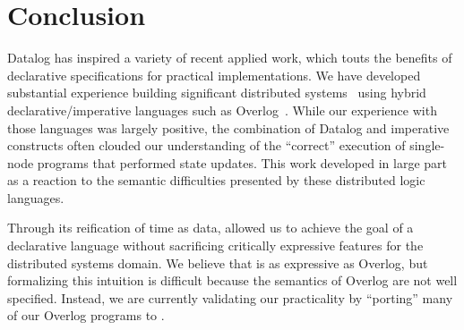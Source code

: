 \section{Conclusion}



Datalog has inspired a variety of recent applied work, which touts the benefits of declarative specifications for practical implementations.  
% 
% 
We have developed substantial experience building significant
distributed systems~\cite{boom-eurosys,Alvaro2009I-Do-Declare:-C,Chu:2007,Loo2009-CACM} using hybrid
declarative/imperative languages such as Overlog~\cite{Loo2009-CACM}.
While our experience with those languages was largely positive, the 
combination of Datalog and imperative constructs 
often clouded  our understanding of the
``correct'' execution of single-node programs that performed state
updates.  
This work developed in large part as a reaction to the semantic difficulties
presented by these distributed logic languages.  

Through its reification of time as data, \lang allowed us to 
achieve the goal of a declarative language without sacrificing critically expressive features for the distributed systems domain.
We believe that \lang is as expressive as Overlog, but formalizing this intuition is difficult because the semantics of Overlog are not well specified.  Instead, we are currently validating our practicality by ``porting'' many of our Overlog programs to \lang.


